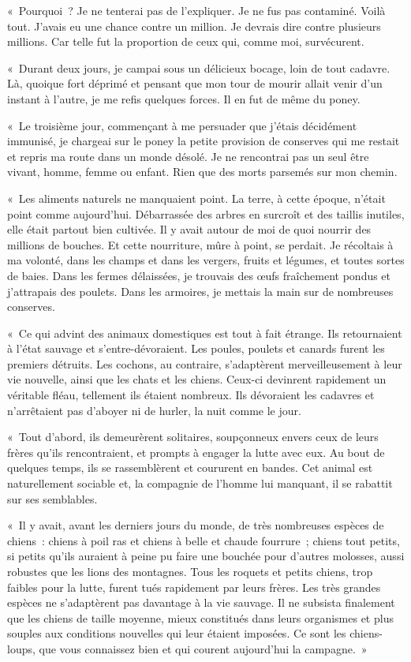 \documentclass[french,twoside]{book} %
\begin{document}
« Pourquoi ? Je ne tenterai pas de l’expliquer. Je ne fus pas contaminé. Voilà tout. J’avais eu une chance contre un million. Je devrais dire contre plusieurs millions. Car telle fut la proportion de ceux qui, comme moi, survécurent.\par
« Durant deux jours, je campai sous un délicieux bocage, loin de tout cadavre. Là, quoique fort déprimé et pensant que mon tour de mourir allait venir d’un instant à l’autre, je me refis quelques forces. Il en fut de même du poney.\par
« Le troisième jour, commençant à me persuader que j’étais décidément immunisé, je chargeai sur le poney la petite provision de conserves qui me restait et repris ma route dans un monde désolé. Je ne rencontrai pas un seul être vivant, homme, femme ou enfant. Rien que des morts parsemés sur mon chemin.\par
« Les aliments naturels ne manquaient point. La terre, à cette époque, n’était point comme aujourd’hui. Débarrassée des arbres en surcroît et des taillis inutiles, elle était partout bien cultivée. Il y avait autour de moi de quoi nourrir des millions de bouches. Et cette nourriture, mûre à point, se perdait. Je récoltais à ma volonté, dans les champs et dans les vergers, fruits et légumes, et toutes sortes de baies. Dans les fermes délaissées, je trouvais des œufs fraîchement pondus et j’attrapais des poulets. Dans les armoires, je mettais la main sur de nombreuses conserves.\par
« Ce qui advint des animaux domestiques est tout à fait étrange. Ils retournaient à l’état sauvage et s’entre-dévoraient. Les poules, poulets et canards furent les premiers détruits. Les cochons, au contraire, s’adaptèrent merveilleusement à leur vie nouvelle, ainsi que les chats et les chiens. Ceux-ci devinrent rapidement un véritable fléau, tellement ils étaient nombreux. Ils dévoraient les cadavres et n’arrêtaient pas d’aboyer ni de hurler, la nuit comme le jour.\par
« Tout d’abord, ils demeurèrent solitaires, soupçonneux envers ceux de leurs frères qu’ils rencontraient, et prompts à engager la lutte avec eux. Au bout de quelques temps, ils se rassemblèrent et coururent en bandes. Cet animal est naturellement sociable et, la compagnie de l’homme lui manquant, il se rabattit sur ses semblables.\par
« Il y avait, avant les derniers jours du monde, de très nombreuses espèces de chiens : chiens à poil ras et chiens à belle et chaude fourrure ; chiens tout petits, si petits qu’ils auraient à peine pu faire une bouchée pour d’autres molosses, aussi robustes que les lions des montagnes. Tous les roquets et petits chiens, trop faibles pour la lutte, furent tués rapidement par leurs frères. Les très grandes espèces ne s’adaptèrent pas davantage à la vie sauvage. Il ne subsista finalement que les chiens de taille moyenne, mieux constitués dans leurs organismes et plus souples aux conditions nouvelles qui leur étaient imposées. Ce sont les chiens-loups, que vous connaissez bien et qui courent aujourd’hui la campagne. »\par
\end{document}
